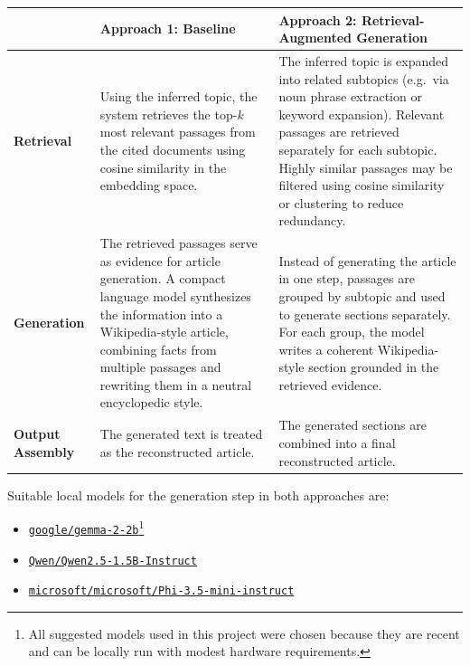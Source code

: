 \documentclass[10pt,a4paper]{article}
\begin{document}
\renewcommand{\arraystretch}{1.2}
\begin{tabularx}{\textwidth}{|>{\raggedright\arraybackslash}p{}|>{\raggedright\arraybackslash}X|>{\raggedright\arraybackslash}X|}
\hline
\textbf{} & \textbf{Approach 1: Baseline} & \textbf{Approach 2: Retrieval-Augmented Generation} \\
\hline
\textbf{Retrieval} &
Using the inferred topic, the system retrieves the top-$k$ most relevant passages from the cited documents using cosine similarity in the embedding space. &
The inferred topic is expanded into related subtopics (e.g.\ via noun phrase extraction or keyword expansion). Relevant passages are retrieved separately for each subtopic. Highly similar passages may be filtered using cosine similarity or clustering to reduce redundancy. \\
\hline
\textbf{Generation} &
The retrieved passages serve as evidence for article generation. A compact language model synthesizes the information into a Wikipedia-style article, combining facts from multiple passages and rewriting them in a neutral encyclopedic style. &
Instead of generating the article in one step, passages are grouped by subtopic and used to generate sections separately. For each group, the model writes a coherent Wikipedia-style section grounded in the retrieved evidence. \\
\hline
\textbf{Output Assembly} &
The generated text is treated as the reconstructed article. &
The generated sections are combined into a final reconstructed article. \\
\hline
\end{tabularx}

\vspace{0.5em}

Suitable local models for the generation step in both approaches are:
\begin{itemize}
    \item \href{https://huggingface.co/google/gemma-2-2b}{\texttt{google/gemma-2-2b}}\footnote{\label{ftnt:models_gen}All suggested models used in this project were chosen because they are recent and can be locally run with modest hardware requirements.}
    \item \href{https://huggingface.co/Qwen/Qwen2.5-1.5B-Instruct}{\texttt{Qwen/Qwen2.5-1.5B-Instruct}}
    \item \href{https://huggingface.co/microsoft/Phi-3.5-mini-instruct}{\texttt{microsoft/microsoft/Phi-3.5-mini-instruct}}
\end{itemize}
\end{document}
